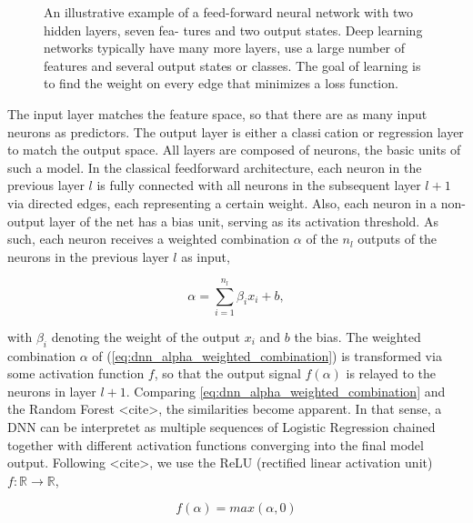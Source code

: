 \begin{figure}[H]
    \captionsetup{format=plain}
    \caption{ 
        An illustrative example of a feed-forward
        neural network with two hidden layers, seven fea-
        tures and two output states. Deep learning networks
        typically have many more layers, use a large number
        of features and several output states or classes. The
        goal of learning is to find the weight on every edge
        that minimizes a loss function.
        }
    \label{fig:deep_network_topology}
\end{figure}

The input layer matches the feature space, so that there are
as many input neurons as predictors. The output layer is either a classication or regression 
layer to match the output space. All layers are composed of neurons, the basic units of such
a model. In the classical feedforward architecture, each neuron in the previous layer $ l $  is fully
connected with all neurons in the subsequent layer $ l + 1 $ via directed edges, each representing
a certain weight. Also, each neuron in a non-output layer of the net has a bias unit, serving
as its activation threshold. As such, each neuron receives a weighted combination $ \alpha $ of the
$ n_{l} $ outputs of the neurons in the previous layer $ l $ as input,

\begin{equation}
    \alpha = \sum_{ i=1 }^{ n_{l} } \beta_{i} x_{i} + b,
    \label{eq:dnn_alpha_weighted_combination}
\end{equation}

with $ \beta_{i} $ denoting the weight of the output $ x_{i} $ and $ b $ the bias. 
The weighted combination $ \alpha $ of (\ref{eq:dnn_alpha_weighted_combination}) is transformed via
some activation function $ f $, so that the output signal $ f(\alpha) $ is relayed to the neurons
in layer $ l + 1 $. Comparing \ref{eq:dnn_alpha_weighted_combination} and the Random Forest <cite>, 
the similarities become apparent. In that sense, a DNN can be interpretet as multiple sequences of Logistic Regression
chained together with different activation functions converging into the final model output.
Following <cite>, we use the ReLU (rectified linear activation unit) 
$ f: \mathbb{R} \rightarrow \mathbb{R} $,

\begin{equation}
    f( \alpha ) = max( \alpha, 0 )
\end{equation}

